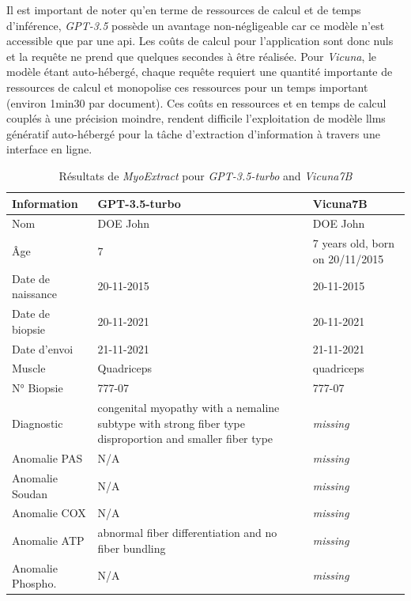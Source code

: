 Il est important de noter qu'en terme de ressources de calcul et de temps d'inférence, \textit{GPT-3.5} possède un avantage non-négligeable car ce modèle n'est accessible que par une \gls{api}. Les coûts de calcul pour l'application sont donc nuls et la requête ne prend que quelques secondes à être réalisée. Pour \textit{Vicuna}, le modèle étant auto-hébergé, chaque requête requiert une quantité importante de ressources de calcul et monopolise ces ressources pour un temps important (environ 1min30 par document). Ces coûts en ressources et en temps de calcul couplés à une précision moindre, rendent difficile l'exploitation de modèle \gls{llms} génératif auto-hébergé pour la tâche d'extraction d'information à travers une interface en ligne.
\begin{table}[!ht]
\centering
\caption{Résultats de \textit{MyoExtract} pour \textit{GPT-3.5-turbo} and \textit{Vicuna7B}}
\label{tab:json_data}
\begin{tabularx}{\textwidth}{|l|X|X|}
\hline
\textbf{Information} & \textbf{GPT-3.5-turbo} & \textbf{Vicuna7B} \\ \hline
Nom & DOE John & DOE John \\ \hline
Âge & 7 & 7 years old, born on 20/11/2015 \\ \hline
Date de naissance & 20-11-2015 & 20-11-2015 \\ \hline
Date de biopsie & 20-11-2021 & 20-11-2021 \\ \hline
Date d'envoi & 21-11-2021 & 21-11-2021 \\ \hline
Muscle & Quadriceps & quadriceps \\ \hline
N° Biopsie & 777-07 & 777-07 \\ \hline
Diagnostic & congenital myopathy with a nemaline subtype with strong fiber type disproportion and smaller fiber type & \textit{missing} \\ \hline
Anomalie PAS & N/A & \textit{missing} \\ \hline
Anomalie Soudan & N/A & \textit{missing} \\ \hline
Anomalie COX & N/A & \textit{missing} \\ \hline
Anomalie ATP & abnormal fiber differentiation and no fiber bundling & \textit{missing} \\ \hline
Anomalie Phospho. & N/A & \textit{missing} \\ \hline
\end{tabularx}
\end{table}

